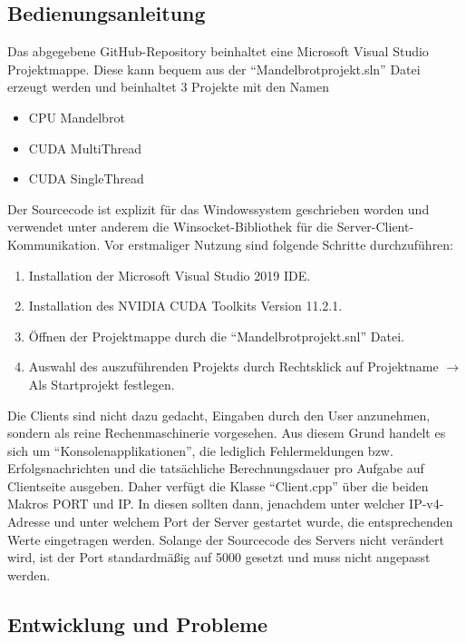 \documentclass[12pt, onecolumn, notitlepage]{scrartcl}
\begin{document}
\subsection{Bedienungsanleitung}
Das abgegebene GitHub-Repository beinhaltet eine Microsoft Visual Studio Projektmappe. Diese kann bequem aus der 
\enquote{Mandelbrotprojekt.sln} Datei erzeugt werden und beinhaltet 3 Projekte mit den Namen 
\begin{itemize}
	\itemsep0pt
	\item CPU Mandelbrot
	\item CUDA MultiThread 
	\item CUDA SingleThread
\end{itemize}

Der Sourcecode ist explizit für das Windowssystem geschrieben worden und verwendet unter anderem die Winsocket-Bibliothek für die Server-Client-Kommunikation. 
Vor erstmaliger Nutzung sind folgende Schritte durchzuführen: 
\begin{enumerate}
	\setlength\itemsep{0.07em}
	\item Installation der Microsoft Visual Studio 2019 IDE.
	\item Installation des NVIDIA CUDA Toolkits Version 11.2.1.
	\item Öffnen der Projektmappe durch die \enquote{Mandelbrotprojekt.snl} Datei.
	\item Auswahl des auszuführenden Projekts durch Rechtsklick auf Projektname $\rightarrow$ Als Startprojekt festlegen.
\end{enumerate}

Die Clients sind nicht dazu gedacht, Eingaben durch den User anzunehmen, sondern als reine Rechenmaschinerie vorgesehen.
Aus diesem Grund handelt es sich um \enquote{Konsolenapplikationen}, die lediglich Fehlermeldungen bzw. Erfolgsnachrichten und die tatsächliche Berechnungsdauer pro Aufgabe auf Clientseite ausgeben.
Daher verfügt die Klasse \enquote{Client.cpp} über die beiden Makros PORT und IP. In diesen sollten dann, jenachdem unter welcher IP-v4-Adresse und unter welchem Port der Server gestartet wurde, die entsprechenden Werte eingetragen werden. Solange der Sourcecode des Servers nicht verändert wird, ist der Port standardmäßig auf 5000 gesetzt und muss  nicht angepasst werden.

\subsection{Entwicklung und Probleme}
\end{document}
